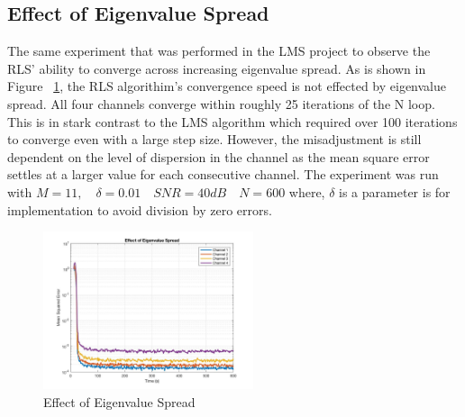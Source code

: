 \documentclass[journal]{IEEEtran}
\begin{document}
\subsection{Effect of Eigenvalue Spread}
The same experiment that was performed in the LMS project to observe the RLS' ability to
converge across increasing eigenvalue spread. As is shown in Figure ~\ref{fig:eigenspread2},
the RLS algorithim's convergence speed is not effected by eigenvalue spread. All four channels converge
within roughly 25 iterations of the N loop. This is in stark contrast to the LMS algorithm which
required over 100 iterations to converge even with a large step size. However, the misadjustment is still dependent on
the level of dispersion in the channel as the mean square error settles at a larger value for each consecutive channel. The experiment was run
with $M = 11, \quad \delta = 0.01 \quad SNR = 40dB \quad N = 600$ where, $\delta$ is a parameter is for implementation
to avoid division by zero errors.
\begin{figure}[H]
  \centering
  \captionsetup{justification=centering,font = small}
  \includegraphics[width=0.55\textwidth, inner] {Plots/Project2_eigenspread.jpg}
  \caption{Effect of Eigenvalue Spread}
    \label{fig:eigenspread2}
\end{figure}
\end{document}
